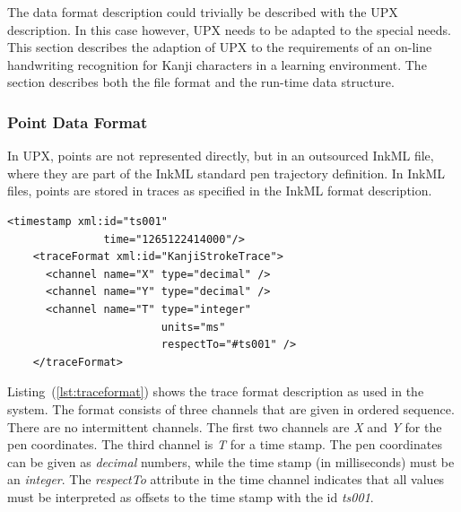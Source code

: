 The data format description could trivially be described with the UPX 
description. In this case however, UPX needs to be adapted to the special needs.
This section describes the adaption of UPX to the requirements of an on-line
handwriting recognition for Kanji characters in a learning environment.
The section describes both the file format and the run-time data structure.

\subsubsection{Point Data Format}
\label{sec:hwre:pointdataformat}

In UPX, points are not represented directly, but in an outsourced InkML file,
where they are part of the InkML standard pen trajectory definition. In InkML
files, points are stored in traces as specified in the InkML format description.
\begin{xmlcode}
  \begin{lstlisting}[emph={traceFormat,channel,timestamp},
                     emphstyle=\color{blue}\textbf,
                     emph={[2]name,type,units,respectTo,id,time},
                     emphstyle={[2]\color{red}},
                     caption={Definition of the trace format},
                     label=lst:traceformat]
    <timestamp xml:id="ts001" 
               time="1265122414000"/>
    <traceFormat xml:id="KanjiStrokeTrace">
      <channel name="X" type="decimal" />
      <channel name="Y" type="decimal" />
      <channel name="T" type="integer"
                        units="ms"
                        respectTo="#ts001" />
    </traceFormat>
  \end{lstlisting}
\end{xmlcode}
Listing~(\ref{lst:traceformat}) shows the trace format description as used in
the system. The format consists of three channels that are given in ordered 
sequence. There are no intermittent channels. The first two channels are \emph{X}
and \emph{Y} for the pen coordinates. The third channel is \emph{T} for a time 
stamp. The pen coordinates can be given as \emph{decimal} numbers, while the
time stamp (in milliseconds) must be an \emph{integer}.
The \emph{respectTo} attribute in the time channel indicates that all values
must be interpreted as offsets to the time stamp with the id \emph{ts001}.

